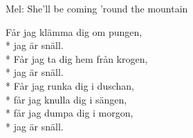 \begin{SongText}
    \begin{SongInfo}
        Mel: She’ll be coming ’round the mountain
    \end{SongInfo}
    \begin{SongVerse}
        Får jag klämma dig om pungen,\\*%
        jag är snäll.\\*%
        Får jag ta dig hem från krogen,\\*%
        jag är snäll.\\*%
        Får jag runka dig i duschan,\\*%
        får jag knulla dig i sängen,\\*%
        får jag dumpa dig i morgon,\\*%
        jag är snäll.
    \end{SongVerse}
\end{SongText}
